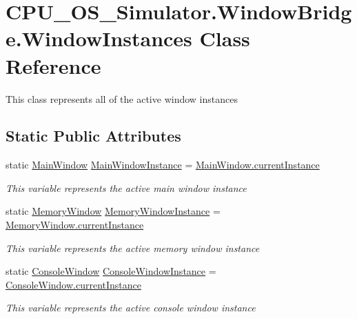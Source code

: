 \hypertarget{class_c_p_u___o_s___simulator_1_1_window_bridge_1_1_window_instances}{}\section{C\+P\+U\+\_\+\+O\+S\+\_\+\+Simulator.\+Window\+Bridge.\+Window\+Instances Class Reference}
\label{class_c_p_u___o_s___simulator_1_1_window_bridge_1_1_window_instances}


This class represents all of the active window instances  


\subsection*{Static Public Attributes}
\begin{DoxyCompactItemize}
\item 
static \hyperlink{class_c_p_u___o_s___simulator_1_1_main_window}{Main\+Window} \hyperlink{class_c_p_u___o_s___simulator_1_1_window_bridge_1_1_window_instances_a130a2c32e8ccfd51a42ecb363fbb42cc}{Main\+Window\+Instance} = \hyperlink{class_c_p_u___o_s___simulator_1_1_main_window_a1280266cc57403a91f08a8350dee05cc}{Main\+Window.\+current\+Instance}
\begin{DoxyCompactList}\small\item\em This variable represents the active main window instance \end{DoxyCompactList}\item 
static \hyperlink{class_c_p_u___o_s___simulator_1_1_memory_window}{Memory\+Window} \hyperlink{class_c_p_u___o_s___simulator_1_1_window_bridge_1_1_window_instances_a401fd485bde830472a1a960a25ec1464}{Memory\+Window\+Instance} = \hyperlink{class_c_p_u___o_s___simulator_1_1_memory_window_a870b795e3b919a82888ad608ab24d61a}{Memory\+Window.\+current\+Instance}
\begin{DoxyCompactList}\small\item\em This variable represents the active memory window instance \end{DoxyCompactList}\item 
static \hyperlink{class_c_p_u___o_s___simulator_1_1_console_window}{Console\+Window} \hyperlink{class_c_p_u___o_s___simulator_1_1_window_bridge_1_1_window_instances_a90b746b2373f150cab75e4dee0f91c45}{Console\+Window\+Instance} = \hyperlink{class_c_p_u___o_s___simulator_1_1_console_window_abee2fd1e118dd4f81dc2142bc033da4a}{Console\+Window.\+current\+Instance}
\begin{DoxyCompactList}\small\item\em This variable represents the active console window instance \end{DoxyCompactList}\end{DoxyCompactItemize}


